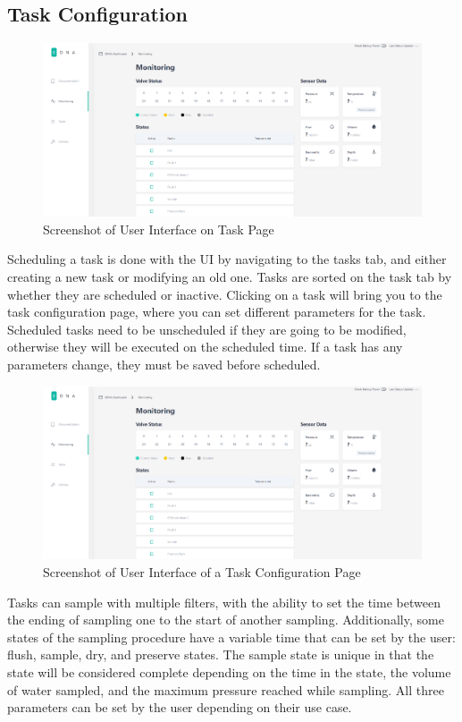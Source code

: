 \documentclass[11pt, letterpaper]{article}
\begin{document}
\subsection{Task Configuration} 
\begin{figure}[H]
	\centering
	\includegraphics[scale=0.35]{./Assets/UI.png} %
	\caption{Screenshot of User Interface on Task Page}
\end{figure}
\par\noindent
Scheduling a task is done with the UI by navigating to the tasks tab, and either creating a new task or modifying an old one. Tasks are sorted on the task tab by whether they are scheduled or inactive. Clicking on a task will bring you to the task configuration page, where you can set different parameters for the task. Scheduled tasks need to be unscheduled if they are going to be modified, otherwise they will be executed on the scheduled time. If a task has any parameters change, they must be saved before scheduled. 
 
\begin{figure}[H]
	\centering
	\includegraphics[scale=0.35]{./Assets/UI.png} %
	\caption{Screenshot of User Interface of a Task Configuration Page }
\end{figure}
\par\noindent
Tasks can sample with multiple filters, with the ability to set the time between the ending of sampling one to the start of another sampling. Additionally, some states of the sampling procedure have a variable time that can be set by the user: flush, sample, dry, and preserve states. The sample state is unique in that the state will be considered complete depending on the time in the state, the volume of water sampled, and the maximum pressure reached while sampling. All three parameters can be set by the user depending on their use case.
\end{document}
